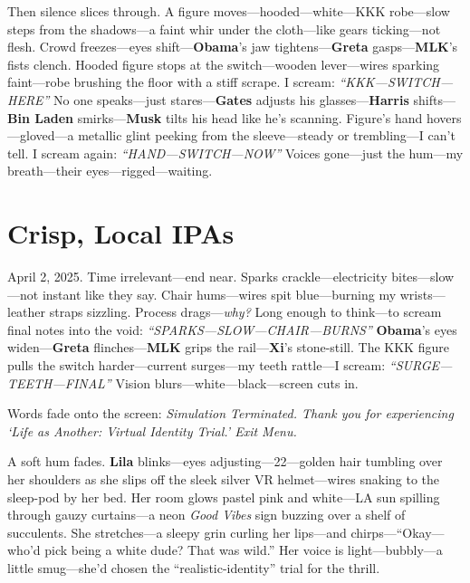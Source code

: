 \documentclass{article}
\begin{document}
Then silence slices through. A figure moves—hooded—white—KKK robe—slow steps from the shadows—a faint whir under the cloth—like gears ticking—not flesh. Crowd freezes—eyes shift—\textbf{Obama}’s jaw tightens—\textbf{Greta} gasps—\textbf{MLK}’s fists clench. Hooded figure stops at the switch—wooden lever—wires sparking faint—robe brushing the floor with a stiff scrape. I scream: \textit{“KKK—SWITCH—HERE”} No one speaks—just stares—\textbf{Gates} adjusts his glasses—\textbf{Harris} shifts—\textbf{Bin Laden} smirks—\textbf{Musk} tilts his head like he’s scanning. Figure’s hand hovers—gloved—a metallic glint peeking from the sleeve—steady or trembling—I can’t tell. I scream again: \textit{“HAND—SWITCH—NOW”} Voices gone—just the hum—my breath—their eyes—rigged—waiting.

\section*{Crisp, Local IPAs}

April 2, 2025. Time irrelevant—end near. Sparks crackle—electricity bites—slow—not instant like they say. Chair hums—wires spit blue—burning my wrists—leather straps sizzling. Process drags—\textit{why?} Long enough to think—to scream final notes into the void: \textit{“SPARKS—SLOW—CHAIR—BURNS”} \textbf{Obama}’s eyes widen—\textbf{Greta} flinches—\textbf{MLK} grips the rail—\textbf{Xi}’s stone-still. The KKK figure pulls the switch harder—current surges—my teeth rattle—I scream: \textit{“SURGE—TEETH—FINAL”} Vision blurs—white—black—screen cuts in.

Words fade onto the screen: \textit{Simulation Terminated. Thank you for experiencing ‘Life as Another: Virtual Identity Trial.’ Exit Menu.}

A soft hum fades. \textbf{Lila} blinks—eyes adjusting—22—golden hair tumbling over her shoulders as she slips off the sleek silver VR helmet—wires snaking to the sleep-pod by her bed. Her room glows pastel pink and white—LA sun spilling through gauzy curtains—a neon \textit{Good Vibes} sign buzzing over a shelf of succulents. She stretches—a sleepy grin curling her lips—and chirps—“Okay—who’d pick being a white dude? That was wild.” Her voice is light—bubbly—a little smug—she’d chosen the “realistic-identity” trial for the thrill.
\end{document}
